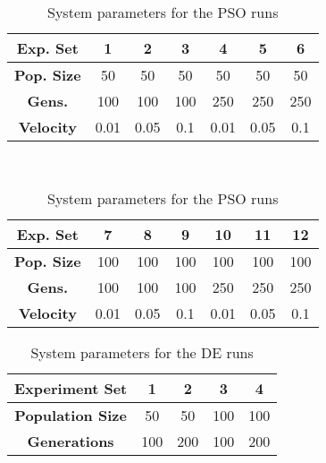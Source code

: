 \begin{table}
	\centering
	\begin{tabular}{ | >{\bfseries}c | c | c | c | c | c | c | }
		\hline
		Exp. Set & 1 & 2 & 3 & 4 & 5 & 6 \\ \hline
		Pop. Size & 50 & 50 & 50 & 50 & 50 & 50 \\ \hline
		Gens. & 100 & 100 & 100 & 250 & 250 & 250 \\ \hline
		Velocity & 0.01 & 0.05 & 0.1 & 0.01 & 0.05 & 0.1 \\ \hline
	\end{tabular}
	\\
	\vspace{3 mm}
	\begin{tabular}{ | >{\bfseries}c | c | c | c | c | c | c | }
		\hline
		Exp. Set & 7 & 8 & 9 & 10 & 11 & 12 \\ \hline
		Pop. Size & 100 & 100 & 100 & 100 & 100 & 100 \\ \hline
		Gens. & 100 & 100 & 100 & 250 & 250 & 250 \\ \hline
		Velocity & 0.01 & 0.05 & 0.1 & 0.01 & 0.05 & 0.1 \\ \hline
	\end{tabular}
	\caption{System parameters for the PSO runs}
	\label{table:ea-pso}
\end{table}

\begin{table}
	\centering
	\begin{tabular}{ | >{\bfseries}c | c | c | c | c | }
		\hline
		Experiment Set & 1 & 2 & 3 & 4 \\ \hline
		Population Size & 50 & 50 & 100 & 100 \\ \hline
		Generations & 100 & 200 & 100 & 200 \\ \hline
	\end{tabular}
	\caption{System parameters for the DE runs}
	\label{table:ea-de}
\end{table}

